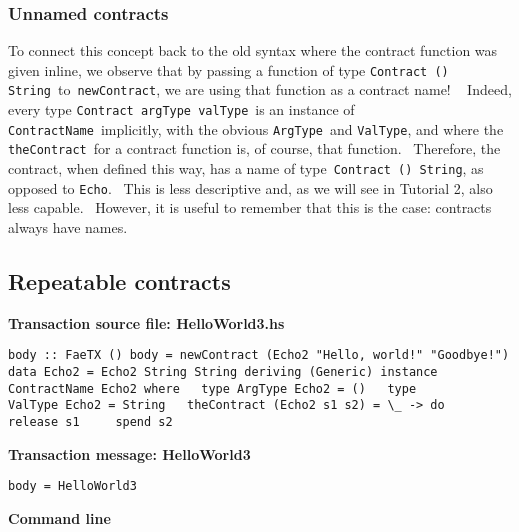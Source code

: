 \documentclass[11pt]{article}
\newcommand{\codeblock}[1]{\begin{mdframed}[
    backgroundcolor=header-color,
    linecolor=header-color,
    innertopmargin=10pt,
    ]{\texttt{#1}}\end{mdframed}}
\begin{document}
\subsubsection{Unnamed contracts}
\vspace{5.5pt}

To connect this concept back to the old syntax where the contract function was given inline, we observe that by passing a function of type \texttt{Contract () String} to \texttt{newContract}, we are using that function as a contract name!   Indeed, every type \texttt{Contract argType valType} is an instance of \texttt{ContractName} implicitly, with the obvious \texttt{ArgType} and \texttt{ValType}, and where the \texttt{theContract} for a contract function is, of course, that function.  Therefore, the contract, when defined this way, has a name of type \texttt{Contract () String}, as opposed to \texttt{Echo}.  This is less descriptive and, as we will see in Tutorial 2, also less capable.  However, it is useful to remember that this is the case: contracts always have names.

\subsection{Repeatable contracts}
\vspace{5.5pt}

\textbf{Transaction source file: HelloWorld3.hs}

\codeblock{body :: FaeTX ()\newline
body = newContract (Echo2 "Hello, world!" "Goodbye!")\newline
\newline
data Echo2 = Echo2 String String deriving (Generic)\newline
\newline
instance ContractName Echo2 where\newline
  type ArgType Echo2 = ()\newline
  type ValType Echo2 = String\newline
  theContract (Echo2 s1 s2) = \textbackslash{}\_ -\textgreater{} do\newline
    release s1\newline
    spend s2}

\textbf{Transaction message: HelloWorld3}

\codeblock{body = HelloWorld3}

\textbf{Command line}
\end{document}
